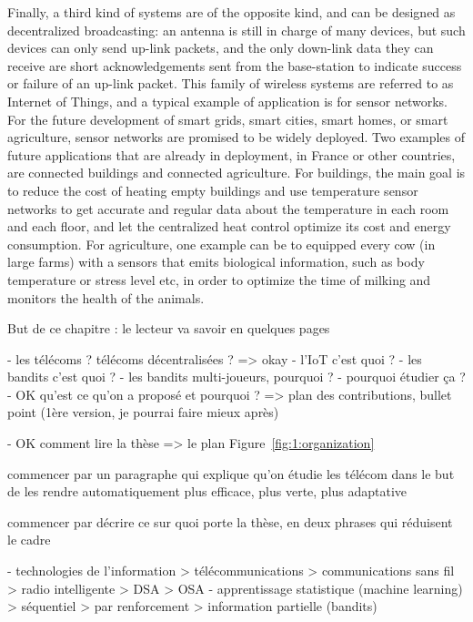 Finally, a third kind of systems are of the opposite kind, and can be designed as decentralized broadcasting: an antenna is still in charge of many devices, but such devices can only send up-link packets, and the only down-link data they can receive are short acknowledgements sent from the base-station to indicate success or failure of an up-link packet.
This family of wireless systems are referred to as Internet of Things,
and a typical example of application is for sensor networks.
For the future development of smart grids, smart cities, smart homes, or smart agriculture, sensor networks are promised to be widely deployed.
Two examples of future applications that are already in deployment, in France or other countries, are connected buildings and connected agriculture.
For buildings, the main goal is to reduce the cost of heating empty buildings and use temperature sensor networks to get accurate and regular data about the temperature in each room and each floor, and let the centralized heat control optimize its cost and energy consumption.
For agriculture, one example can be to equipped every cow (in large farms) with a sensors that emits biological information, such as body temperature or stress level etc, in order to optimize the time of milking and monitors the health of the animals.

\newpage

But de ce chapitre :
le lecteur va savoir en quelques pages

- les télécoms ? télécoms décentralisées ?
  => okay
- l'IoT c'est quoi ?
- les bandits c'est quoi ?
- les bandits multi-joueurs, pourquoi ?
- pourquoi étudier ça ?
- OK qu'est ce qu'on a proposé et pourquoi ?
  => plan des contributions, bullet point (1ère version, je pourrai faire mieux après)

- OK comment lire la thèse
  => le plan Figure~\ref{fig:1:organization}




commencer par un paragraphe qui explique qu'on étudie les télécom dans le but de les rendre automatiquement plus efficace, plus verte, plus adaptative

commencer par décrire ce sur quoi porte la thèse, en deux phrases qui réduisent le cadre

- technologies de l'information > télécommunications > communications sans fil > radio intelligente > DSA > OSA
- apprentissage statistique (machine learning) > séquentiel > par renforcement > information partielle (bandits)

